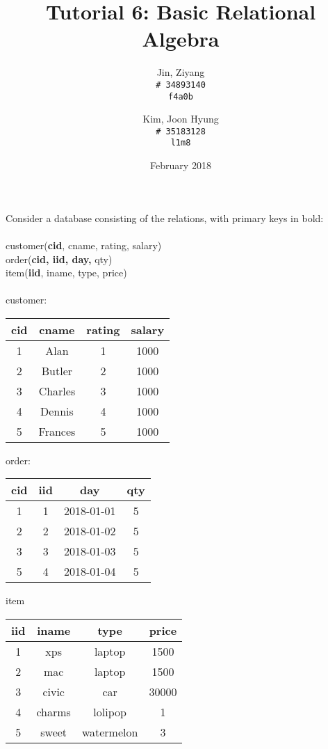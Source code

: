 \documentclass{article}
\title{Tutorial 6: Basic Relational Algebra}
\author{
	Jin, Ziyang\\
	\texttt{\# 34893140}\\
	\texttt{f4a0b}
	\and
	Kim, Joon Hyung\\
	\texttt{\# 35183128}\\
	\texttt{l1m8}
}
\date{February 2018}
\begin{document}
	\maketitle

\noindent Consider a database consisting of the relations, with primary keys in bold:\\
\\
customer(\textbf{cid}, cname, rating, salary)\\
order(\textbf{cid, iid, day,} qty)\\
item(\textbf{iid}, iname, type, price)\\
\\

customer:
\begin{center}
 \begin{tabular}{||c c c c||} 
 \hline
 cid & cname & rating & salary \\ [0.5ex] 
 \hline\hline
 1 & Alan & 1 & 1000 \\ 
 \hline
 2 & Butler & 2 & 1000 \\
 \hline
 3 & Charles & 3 & 1000 \\
 \hline
 4 & Dennis & 4 & 1000 \\
 \hline
 5 & Frances & 5 & 1000 \\ [1ex] 
 \hline
\end{tabular}
\end{center}

order:
\begin{center}
 \begin{tabular}{||c c c c||} 
 \hline
 cid & iid & day & qty \\ [0.5ex] 
 \hline\hline
 1 & 1 & 2018-01-01 & 5 \\ 
 \hline
 2 & 2 & 2018-01-02 & 5 \\
 \hline
 3 & 3 & 2018-01-03 & 5 \\
 \hline
 5 & 4 & 2018-01-04 & 5 \\ [1ex] 
 \hline
\end{tabular}
\end{center}

item
\begin{center}
 \begin{tabular}{||c c c c||} 
 \hline
 iid & iname & type & price \\ [0.5ex] 
 \hline\hline
 1 & xps & laptop & 1500 \\ 
 \hline
 2 & mac & laptop & 1500 \\
 \hline
 3 & civic & car & 30000 \\
 \hline
 4 & charms & lolipop & 1 \\
 \hline
 5 & sweet & watermelon & 3 \\ [1ex] 
 \hline
\end{tabular}
\end{center}
\end{document}
